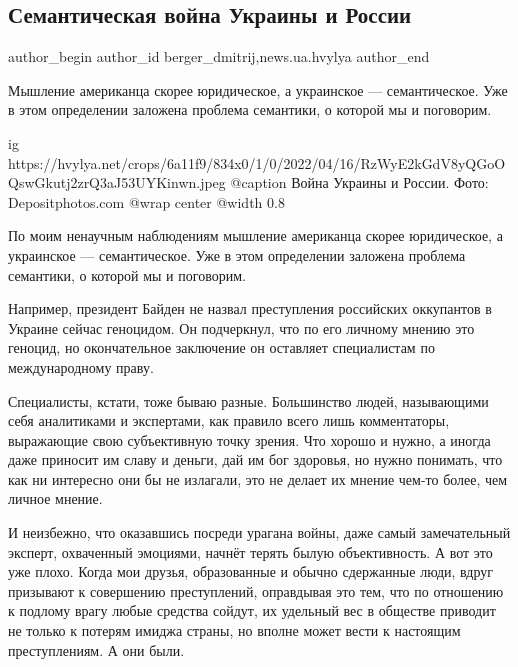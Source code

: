  
 
 
 
 
 
\subsection{Семантическая война Украины и России}
\label{sec:16_04_2022.stz.news.ua.hvylya.1.semantic_war_ukrros}
 
\ifcmt
 author_begin
   author_id berger_dmitrij,news.ua.hvylya
 author_end
\fi

\begin{zznagolos}
Мышление американца скорее юридическое, а украинское — семантическое. Уже в
этом определении заложена проблема семантики, о которой мы и поговорим.	
\end{zznagolos}

\ifcmt
  ig https://hvylya.net/crops/6a11f9/834x0/1/0/2022/04/16/RzWyE2kGdV8yQGoOQswGkutj2zrQ3aJ53UYKinwn.jpeg
	@caption Война Украины и России. Фото: Depositphotos.com
  @wrap center
  @width 0.8
\fi

По моим ненаучным наблюдениям мышление американца скорее юридическое, а
украинское — семантическое. Уже в этом определении заложена проблема семантики,
о которой мы и поговорим.

Например, президент Байден не назвал преступления российских оккупантов в
Украине сейчас геноцидом. Он подчеркнул, что по его личному мнению это геноцид,
но окончательное заключение он оставляет специалистам по международному праву.

Специалисты, кстати, тоже бываю разные. Большинство людей, называющими себя
аналитиками и экспертами, как правило всего лишь комментаторы, выражающие свою
субъективную точку зрения. Что хорошо и нужно, а иногда даже приносит им славу
и деньги, дай им бог здоровья, но нужно понимать, что как ни интересно они бы
не излагали, это не делает их мнение чем-то более, чем личное мнение.

И неизбежно, что оказавшись посреди урагана войны, даже самый замечательный
эксперт, охваченный эмоциями, начнёт терять былую объективность. А вот это уже
плохо. Когда мои друзья, образованные и обычно сдержанные люди, вдруг призывают
к совершению преступлений, оправдывая это тем, что по отношению к подлому врагу
любые средства сойдут, их удельный вес в обществе приводит не только к потерям
имиджа страны, но вполне может вести к настоящим преступлениям. А они были.

